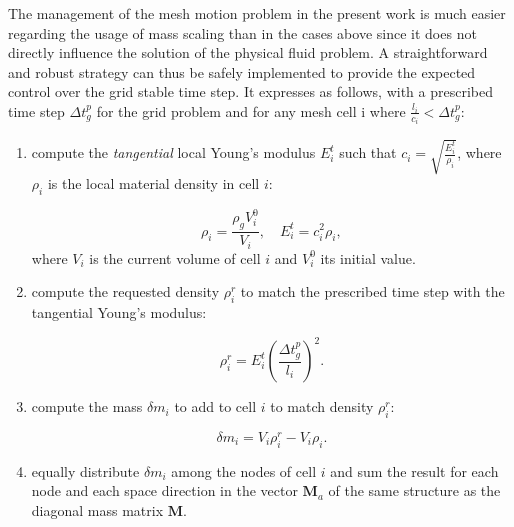 The management of the mesh motion problem in the present work is much easier regarding the usage of mass scaling than in the cases above since it does not directly influence the solution of the physical fluid problem. A straightforward and robust strategy can thus be safely implemented to provide the expected control over the grid stable time step. It expresses as follows, with a prescribed time step $\Delta t_g^p$ for the grid problem and for any mesh cell i where $\frac{l_i}{c_i} < \Delta t_g^p$: 
\begin{enumerate}
    \item compute the \textit{tangential} local Young's modulus $E_i^t$ such that $c_i = \sqrt{\frac{E_i^t}{\rho_i}}$, where $\rho_i$ is the local material density in cell $i$:
    
    \begin{equation}
        \rho_i = \frac{\rho_g V_i^0}{V_i}, \quad 
        E_i^t = c_i^2 \rho_i,
    \end{equation}
    where $V_i$ is the current volume of cell $i$ and $V_i^0$ its initial value.
    
    \item compute the requested density $\rho_i^r$ to match the prescribed time step with the tangential Young's modulus:
    
    \begin{equation}
        \rho_i^r = E_i^t \left ( \frac{\Delta t_g^p}{l_i} \right )^2.
    \end{equation}
    
    \item compute the mass $\delta m_i$ to add to cell $i$ to match density $\rho_i^r$:
    
    \begin{equation}
        \delta m_i = V_i \rho_i^r - V_i \rho_i.
    \end{equation}
    
    \item equally distribute $\delta m_i$ among the nodes of cell $i$ and sum the result for each node and each space direction in the vector $\mathbf{M}_a$ of the same structure as the diagonal mass matrix $\mathbf{M}$.
\end{enumerate}




